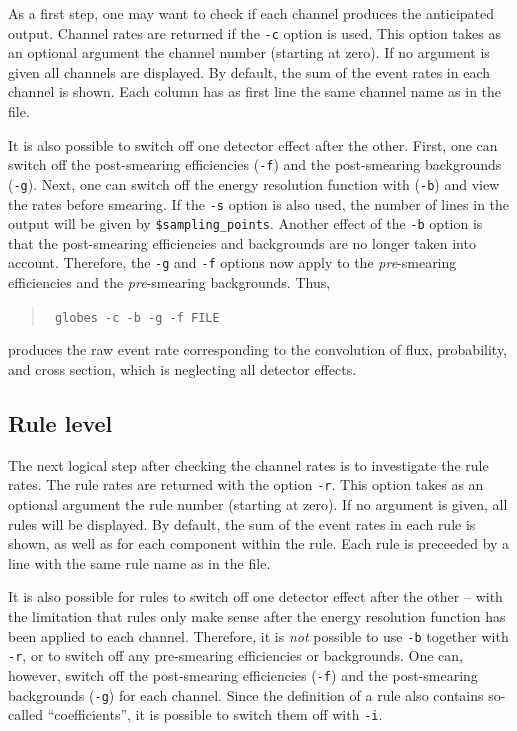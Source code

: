 As a first step, one may want to check if each channel produces the 
anticipated output. Channel rates are returned if the {\tt -c} option 
is used.
This option takes as an optional argument the channel number 
(starting at zero). If no argument is given all channels are displayed.
By default, the sum of the event rates in each channel is shown. Each 
column has as first line the same channel name as in the file. 

It is also possible to switch off one detector effect after the other. 
First, one can switch off the post-smearing efficiencies ({\tt -f}) and the 
post-smearing backgrounds ({\tt -g}). Next, one can switch off the 
energy resolution function with ({\tt -b}) and view the rates before
smearing. If the {\tt -s} option is also used, the number of
lines in the output will be given by {\tt \$sampling\_points}.
Another effect of the {\tt -b} option is that the post-smearing efficiencies
and backgrounds are no longer taken into account. Therefore, the {\tt -g} 
and {\tt -f} options now apply to the \emph{pre}-smearing efficiencies 
and the \emph{pre}-smearing backgrounds. Thus, 
\begin{quote}
{\tt
globes -c -b -g -f FILE
}
\end{quote}
produces the raw event rate corresponding to the convolution of flux, 
probability, and cross section, which is neglecting all detector effects.

\subsection*{Rule level}

The next logical step after checking the channel rates is to investigate
 the rule rates. The rule rates are returned with the option {\tt -r}.
This option takes as an optional argument the rule number 
(starting at zero). If no argument is given, all rules will be displayed.
By default, the sum of the event rates in each rule is shown, as well
as for each component within the rule. Each 
rule is preceeded by a line with the same rule name as in the file. 

It is also possible for rules to switch off one detector effect after 
the other -- with the limitation that rules only make sense
after the energy resolution function has been applied to each channel.
Therefore, it is \emph{not} possible to use {\tt -b} together with {\tt -r}, or to switch off any pre-smearing efficiencies or backgrounds. 
One can, however, switch off the post-smearing efficiencies ({\tt -f}) 
and the post-smearing backgrounds ({\tt -g}) for each channel. Since
the definition of a rule also contains so-called ``coefficients'', it is
possible to switch them off with {\tt -i}. 


